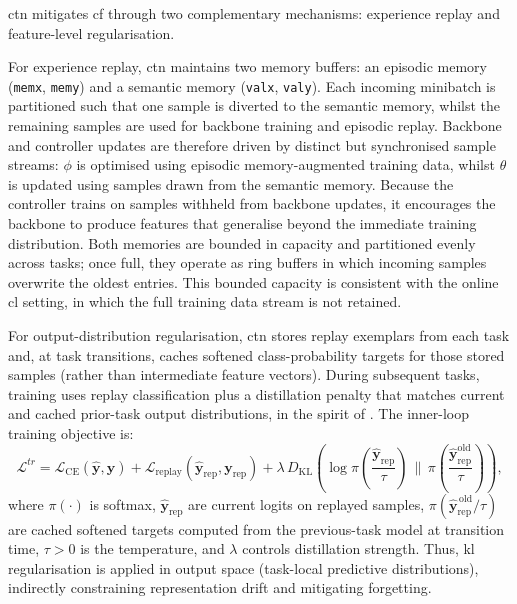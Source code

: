 \gls{ctn} mitigates \gls{cf} through two complementary mechanisms: experience
replay and feature-level regularisation.

For experience replay, \gls{ctn} maintains two memory buffers: an episodic
memory (\texttt{memx}, \texttt{memy}) and a semantic memory (\texttt{valx},
\texttt{valy}). Each incoming minibatch is partitioned such that one sample is
diverted to the semantic memory, whilst the remaining samples are used for
backbone training and episodic replay. Backbone and controller updates are
therefore driven by distinct but synchronised sample streams: $\phi$ is
optimised using episodic memory-augmented training data, whilst $\theta$ is
updated using samples drawn from the semantic memory. Because the controller
trains on samples withheld from backbone updates, it encourages the backbone to
produce features that generalise beyond the immediate training distribution.
Both memories are bounded in capacity and partitioned evenly across tasks; once
full, they operate as ring buffers in which incoming samples overwrite the
oldest entries. This bounded capacity is consistent with the online \gls{cl}
setting, in which the full training data stream is not retained.

For output-distribution regularisation, \gls{ctn} stores replay exemplars from each
task and, at task transitions, caches softened class-probability targets for those
stored samples (rather than intermediate feature vectors). During subsequent tasks,
training uses replay classification plus a distillation penalty that matches current
and cached prior-task output distributions, in the spirit of \cite{ll_lwf_2017}. The
inner-loop training objective is:
%
\begin{equation}
\mathcal{L}^{tr}
= \mathcal{L}_{\mathrm{CE}}\!\left(\hat{\mathbf{y}}, \mathbf{y}\right)
+ \mathcal{L}_{\mathrm{replay}}\!\left(\hat{\mathbf{y}}_{\mathrm{rep}}, \mathbf{y}_{\mathrm{rep}}\right)
+ \lambda \,
D_{\mathrm{KL}}\!\left(
\log \pi\!\left(\frac{\hat{\mathbf{y}}_{\mathrm{rep}}}{\tau}\right)
\,\Big\|\,
\pi\left(\dfrac{\hat{\mathbf{y}}^{\mathrm{old}}_{\mathrm{rep}}}{\tau}\right)
\right),
\end{equation}
%
where $\pi(\cdot)$ is softmax, $\hat{\mathbf{y}}_{\mathrm{rep}}$ are current logits on
replayed samples, $\pi(\hat{\mathbf{y}}^{\,\mathrm{old}}_{\mathrm{rep}}/\tau)$ are cached softened targets
computed from the previous-task model at transition time, $\tau>0$ is the temperature,
and $\lambda$ controls distillation strength.
Thus, \gls{kl} regularisation is applied in output space (task-local predictive
distributions), indirectly constraining representation drift and mitigating forgetting.

